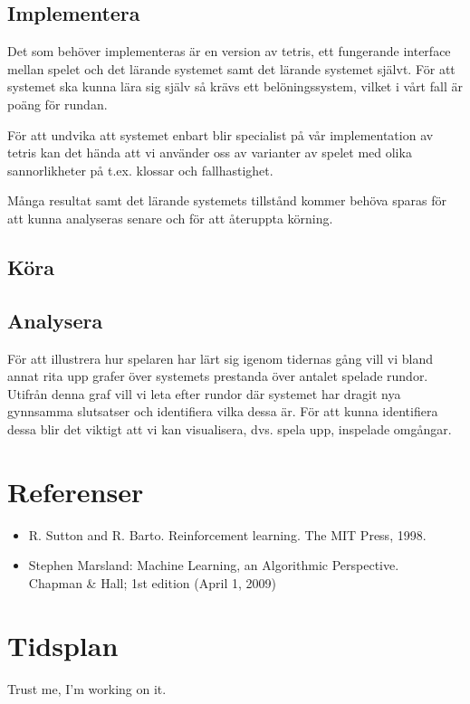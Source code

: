 \documentclass[a4paper,11pt]{article}
\begin{document}
\subsection*{Implementera}

Det som behöver implementeras är en version av tetris, ett fungerande interface mellan spelet och det lärande systemet samt det lärande systemet självt. För att systemet ska kunna lära sig själv så krävs ett belöningssystem, vilket i vårt fall är poäng för rundan.

För att undvika att systemet enbart blir specialist på vår implementation av tetris kan det hända att vi använder oss av varianter av spelet med olika sannorlikheter på t.ex. klossar och fallhastighet.

Många resultat samt det lärande systemets tillstånd kommer behöva sparas för att kunna analyseras senare och för att återuppta körning.

\subsection*{Köra}

\subsection*{Analysera}

För att illustrera hur spelaren har lärt sig igenom tidernas gång vill vi bland annat rita upp grafer över systemets prestanda över antalet spelade rundor. Utifrån denna graf vill vi leta efter rundor där systemet har dragit nya gynnsamma slutsatser och identifiera vilka dessa är. För att kunna identifiera dessa blir det viktigt att vi kan visualisera, dvs. spela upp, inspelade omgångar.

\section*{Referenser}

\begin{itemize}
\item R. Sutton and R. Barto. Reinforcement learning. The MIT Press, 1998.

\item Stephen Marsland: Machine Learning, an Algorithmic Perspective. \\ Chapman \& Hall; 1st edition (April 1, 2009)
\end{itemize}

\section*{Tidsplan}

Trust me, I'm working on it.
\end{document}
